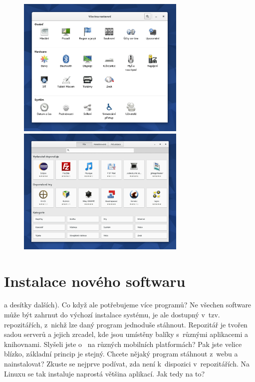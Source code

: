 \begin{figure}[p]
\begin{center}
\includegraphics[width=0.72\textwidth]{img/nastaveni}
 \label{fig:nastaveni}
\bigskip
\includegraphics[width=0.72\textwidth]{img/software}
 \label{fig:software}
\end{center}
\end{figure}

\section*{Instalace nového softwaru}
 a desítky dalších). Co když ale potřebujeme více programů? Ne všechen software může být zahrnut do výchozí instalace systému, je ale dostupný v~tzv. repozitářích, z~nichž lze daný program jednoduše stáhnout. Repozitář je tvořen sadou serverů a jejich zrcadel, kde jsou umístěny balíky s~různými aplikacemi a knihovnami. Slyšeli jste o~ na různých mobilních platformách? Pak jste velice blízko, základní princip je stejný. Chcete nějaký program stáhnout z~webu a nainstalovat? Zkuste se nejprve podívat, zda není k~dispozici v~repozitářích. Na Linuxu se tak instaluje naprostá většina aplikací. Jak tedy na to?

